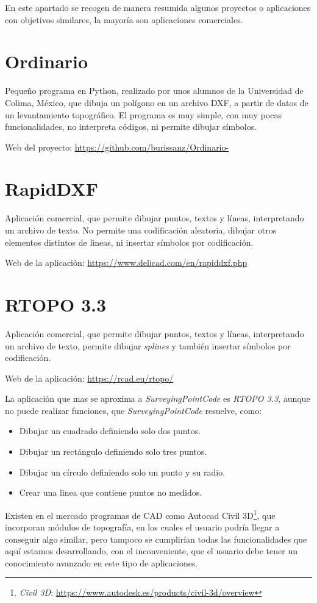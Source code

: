 
En este apartado se recogen de manera resumida algunos proyectos o aplicaciones con objetivos similares, la mayoría son aplicaciones comerciales.

\section{Ordinario}

Pequeño programa en Python, realizado por unos alumnos de la Universidad de Colima, México, que dibuja un polígono en un archivo DXF, a partir de datos de un levantamiento topográfico. El programa es muy simple, con muy pocas funcionalidades, no interpreta códigos, ni permite dibujar símbolos. 

Web del proyecto: \url{https://github.com/burissanz/Ordinario-}


\section{RapidDXF}

Aplicación comercial, que permite dibujar puntos, textos y líneas, interpretando un archivo de texto. No permite una codificación aleatoria, dibujar otros elementos distintos de lineas, ni insertar símbolos por codificación.

Web de la aplicación: \url{https://www.delicad.com/en/rapiddxf.php}


\section{RTOPO 3.3}
Aplicación comercial, que permite dibujar puntos, textos y líneas, interpretando un archivo de texto, permite dibujar \emph{splines} y también insertar símbolos por codificación.

Web de la aplicación: \url{https://rcad.eu/rtopo/}

La aplicación que mas se aproxima a \emph{SurveyingPointCode} es \emph{RTOPO 3.3}, aunque no puede realizar funciones, que \emph{SurveyingPointCode} resuelve, como:
\begin{itemize}
\item Dibujar un cuadrado definiendo solo dos puntos.
\item Dibujar un rectángulo definiendo solo tres puntos.
\item Dibujar un círculo definiendo solo un punto y su radio.
\item Crear una linea que contiene puntos no medidos.
\end{itemize}


Existen en el mercado programas de CAD como Autocad Civil 3D\footnote{\textsl{Civil 3D}: \url{https://www.autodesk.es/products/civil-3d/overview}}, que incorporan módulos de topografía, en los cuales el usuario podría llegar a conseguir algo similar, pero tampoco se cumplirían todas las funcionalidades que aquí estamos desarrollando, con el inconveniente, que el usuario debe tener un conocimiento avanzado en este tipo de aplicaciones.
